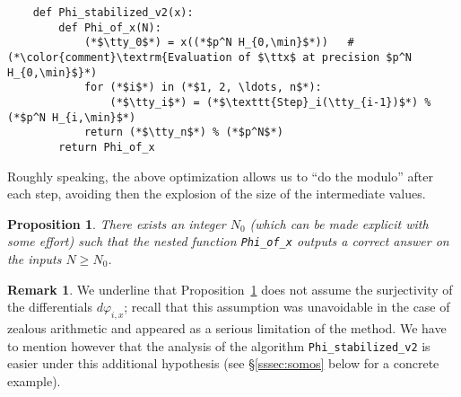 \documentclass[11pt]{article}
\numberwithin{equation}{section}
\numberwithin{figure}{section}
\renewcommand{\geq}{\geqslant}
\newtheorem{prop}[theo]{Proposition}
\theoremstyle{definition}
\newtheorem{rem}[theo]{Remark}
\renewcommand{\min}{\text{\rm min}}
\newcommand{\ttx}{\texttt{\rm x}\xspace}
\newcommand{\tty}{\texttt{\rm y}\xspace}
\begin{document}
\begin{lstlisting}
    def Phi_stabilized_v2(x):
        def Phi_of_x(N):
            (*$\tty_0$*) = x((*$p^N H_{0,\min}$*))   # (*\color{comment}\textrm{Evaluation of $\ttx$ at precision $p^N H_{0,\min}$}*)
            for (*$i$*) in (*$1, 2, \ldots, n$*):
                (*$\tty_i$*) = (*$\texttt{Step}_i(\tty_{i-1})$*) % (*$p^N H_{i,\min}$*)
            return (*$\tty_n$*) % (*$p^N$*)
        return Phi_of_x
\end{lstlisting}

\noindent
Roughly speaking, the above optimization allows us to ``do the modulo'' 
after each step, avoiding then the explosion of the size of the 
intermediate values.

\begin{prop}
\label{prop:adaptlazy}
There exists an integer $N_0$ (which can be made explicit with some
effort) such that the nested function \textrm{\tt Phi\_of\_x} outputs a
correct answer on the inputs $N \geq N_0$.
\end{prop}

\begin{rem}
We underline that Proposition~\ref{prop:adaptlazy} does not assume the 
surjectivity of the differentials $d \varphi_{i,x}$; recall that this 
assumption was unavoidable in the case of zealous arithmetic and 
appeared as a serious limitation of the method. We have to mention 
however that the analysis of the algorithm \texttt{Phi\_stabilized\_v2} 
is easier under this additional hypothesis (see \S \ref{sssec:somos} 
below for a concrete example).
\end{rem}
\end{document}
